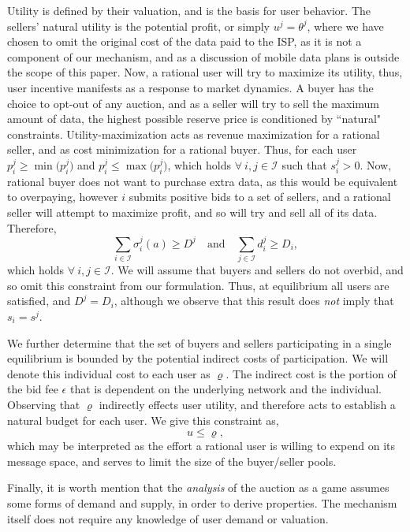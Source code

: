 \documentclass[sigconf, anonymous]{acmart}
\newcommand{\mcI}{\mathcal{I}}
\newcommand{\g}{\sigma}
\theoremstyle{definition}
\begin{document}
Utility is defined by their valuation, and is the basis for user behavior. 
The sellers' natural utility is the potential
profit, or simply $u^j = \theta^j$, where we have chosen to omit the original cost of the data
paid to the ISP, as it is not a component of our mechanism, and as a discussion
of mobile data plans is outside the scope of this paper.  
Now, a rational user will try
to maximize its utility, thus, user incentive manifests as a
response to market dynamics. A buyer has the choice to
opt-out of any auction, and as a seller will try to sell the maximum amount of
data, the highest possible reserve price is conditioned by ``natural" constraints. Utility-maximization 
acts as revenue maximization for a rational seller, and as cost minimization for a
rational buyer. Thus, for each user $p_i^j \ge \min\big(p_i^j)$ and $p_i^j \le
\max\big(p_i^j)$, which holds $\forall \ i, j\in\mcI$ such that $s_i^j>0$.
Now, rational buyer does not want to purchase extra data, as this would be
equivalent to overpaying, however $i$ submits positive bids to a set of
sellers, and a rational seller will attempt to maximize profit, and so will try and sell all of
its data. Therefore,
\begin{equation}\label{bidcap}
    \displaystyle\sum_{i\in\mcI} \g_i^j(a) \ge D^j \quad\text{and}\quad
\sum_{j\in\mcI} d^j_i \ge D_i,
\end{equation}
which holds $\forall \ i,j\in\mcI$. We will assume that buyers and sellers do not overbid, and so omit this
constraint from our formulation.
Thus, at equilibrium all users are satisfied, and 
$D^j = D_i$, although we observe that this result
does \emph{not} imply that $s_i=s^j$. 

We further determine that the set of buyers and sellers participating
in a single equilibrium is bounded by the potential indirect costs of
participation. We will denote this individual cost to each user as
$\varrho$. The indirect cost is the portion of the bid fee
$\epsilon$ that is dependent on the underlying network and the individual.
Observing that $\varrho$ indirectly effects user utility,
and therefore acts to establish a natural budget for each user. We give this
constraint as, 
\begin{equation}\label{poolbnd}
    u \le \varrho,
\end{equation}
which may be interpreted as the effort a rational user is willing to expend
on its message space, and serves to limit the size of the buyer/seller pools.
 
Finally, it is worth mention that the \emph{analysis} of the auction as
a game assumes some forms of demand and supply, in order to derive properties.
The mechanism itself does not require any knowledge of user demand or
valuation. 
\end{document}
